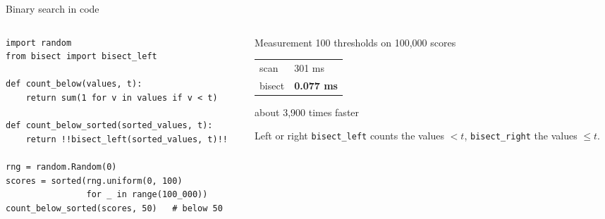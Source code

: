 \documentclass[aspectratio=169,11pt]{beamer}
\begin{document}
\begin{frame}[fragile]{Binary search in code}
  \begin{columns}[T,onlytextwidth]
  \begin{column}{0.60\textwidth}
\begin{lstlisting}
import random
from bisect import bisect_left

def count_below(values, t):
    return sum(1 for v in values if v < t)

def count_below_sorted(sorted_values, t):
    return !!bisect_left(sorted_values, t)!!

rng = random.Random(0)
scores = sorted(rng.uniform(0, 100)
                for _ in range(100_000))
count_below_sorted(scores, 50)   # below 50
\end{lstlisting}
  \end{column}
  \begin{column}{0.37\textwidth}
    \begin{block}{Measurement}
      100 thresholds on 100,000 scores\par\smallskip
      \begin{tabular}{@{}ll@{}}
        scan & 301 ms\\
        bisect & \textbf{0.077 ms}\\
      \end{tabular}\par\smallskip
      about 3,900 times faster
    \end{block}
    \begin{block}{Left or right}
      \texttt{bisect\_left} counts the values $< t$, \texttt{bisect\_right} the values
      $\le t$.
    \end{block}
  \end{column}
  \end{columns}
\end{frame}
\end{document}
